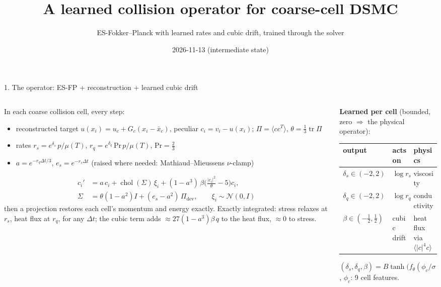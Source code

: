 \documentclass[10pt,aspectratio=169]{beamer}
\title{A learned collision operator for coarse-cell DSMC}
\subtitle{ES-Fokker--Planck with learned rates and cubic drift, trained through the solver}
\date{2026-11-13 \quad (intermediate state)}
\begin{document}
\begin{frame}
\titlepage
\end{frame}

\begin{frame}{1. The operator: ES-FP + reconstruction + learned cubic drift}
\begin{columns}[T]
\begin{column}{0.55\textwidth}
\small
In each coarse collision cell, every step:
\begin{itemize}\setlength{\itemsep}{2pt}
\item reconstructed target $u(x_i)=u_c+G_c(x_i-\bar x_c)$, peculiar $c_i=v_i-u(x_i)$;
  $\Pi=\langle cc^T\rangle$, $\theta=\tfrac13\operatorname{tr}\Pi$
\item rates \quad $r_s=e^{\delta_s}\,p/\mu(T)$, \quad $r_q=e^{\delta_q}\,\mathrm{Pr}\,p/\mu(T)$,
  \quad $\mathrm{Pr}=\tfrac23$
\item $a=e^{-r_q\Delta t/3}$, \; $e_s=e^{-r_s\Delta t}$ (raised where needed: Mathiaud--Mieussens
  $\nu$-clamp)
\end{itemize}
\vspace{-4pt}
\begin{align*}
c_i' &= a\,c_i + \operatorname{chol}(\Sigma)\,\xi_i
 + (1-a^3)\,\beta\Big(\tfrac{|c_i|^2}{\theta}-5\Big)c_i,\\
\Sigma &= \theta(1-a^2)I+(e_s-a^2)\,\Pi_{\mathrm{dev}},\qquad \xi_i\sim\mathcal N(0,I)
\end{align*}
then a projection restores each cell's momentum and energy exactly.
Exactly integrated: stress relaxes at $r_s$, heat flux at $r_q$, for any $\Delta t$; the
cubic term adds $\approx27(1-a^3)\beta\,q$ to the heat flux, $\approx0$ to stress.
\end{column}
\begin{column}{0.43\textwidth}
\footnotesize
\textbf{Learned per cell} (bounded, zero $\Rightarrow$ the physical operator):
\begin{center}
\begin{tabular}{@{}lll@{}}
\toprule
output & acts on & physics \\ \midrule
$\delta_s\in(-2,2)$ & $\log r_s$ & viscosity \\
$\delta_q\in(-2,2)$ & $\log r_q$ & conductivity \\
$\beta\in(-\tfrac12,\tfrac12)$ & cubic drift & heat flux via $\langle|c|^4c\rangle$ \\
\bottomrule
\end{tabular}
\end{center}
$(\delta_s,\delta_q,\beta)=B\tanh\!\big(f_\theta(\phi_c/\sigma)/B\big)$, $\phi_c$: 9 cell features.


\end{column}
\end{columns}
\end{frame}
\end{document}
